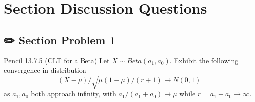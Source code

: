 \documentclass[
  letterpaper,
  DIV=11,
  numbers=noendperiod]{scrreprt}
\theoremstyle{definition}
\theoremstyle{plain}
\theoremstyle{remark}
\begin{document}
\hypertarget{section-discussion-questions-7}{%
\section*{Section Discussion
Questions}\label{section-discussion-questions-7}}


\hypertarget{section-problem-1-7}{%
\subsection*{✏️ Section Problem 1}\label{section-problem-1-7}}

Pencil 13.7.5 (CLT for a Beta) Let \(X\sim Beta(a_{1} ,a_{0})\). Exhibit
the following convergence in distribution \[
\begin{equation*}
(X-\mu )/\sqrt{\mu (1-\mu )/(r+1)}\rightarrow N(0,1)
\end{equation*}
\] as \(a_{1} ,a_{0}\) both approach infinity, with
\(a_{1} /(a_{1} +a_{0} )\rightarrow \mu\) while
\(r=a_{1} +a_{0}\rightarrow \infty\).
\end{document}
